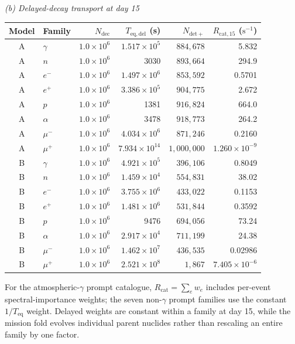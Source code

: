 \documentclass[11pt]{article}
\begin{document}
\begin{table}[!htbp]
\vspace{0.45em}
\noindent\textit{(b) Delayed-decay transport at day 15}\par\vspace{0.20em}
\begin{tabular}{clrrrr}
\toprule
Model & Family & $N_{\mathrm{dec}}$ & $T_{\mathrm{eq,del}}$ (s)
& $N_{\mathrm{det+}}$ & $R_{\mathrm{cat},15}$ ($\mathrm{s^{-1}}$) \\
\midrule
A & $\gamma$ & $1.0\times10^6$ & $1.517\times10^5$ & $884{,}678$ & 5.832 \\
A & $n$ & $1.0\times10^6$ & 3030 & $893{,}664$ & 294.9 \\
A & $e^-$ & $1.0\times10^6$ & $1.497\times10^6$ & $853{,}592$ & 0.5701 \\
A & $e^+$ & $1.0\times10^6$ & $3.386\times10^5$ & $904{,}775$ & 2.672 \\
A & $p$ & $1.0\times10^6$ & 1381 & $916{,}824$ & 664.0 \\
A & $\alpha$ & $1.0\times10^6$ & 3478 & $918{,}773$ & 264.2 \\
A & $\mu^-$ & $1.0\times10^6$ & $4.034\times10^6$ & $871{,}246$ & 0.2160 \\
A & $\mu^+$ & $1.0\times10^6$ & $7.934\times10^{14}$ & $1{,}000{,}000$ & $1.260\times10^{-9}$ \\
\addlinespace[0.25em]
B & $\gamma$ & $1.0\times10^6$ & $4.921\times10^5$ & $396{,}106$ & 0.8049 \\
B & $n$ & $1.0\times10^6$ & $1.459\times10^4$ & $554{,}831$ & 38.02 \\
B & $e^-$ & $1.0\times10^6$ & $3.755\times10^6$ & $433{,}022$ & 0.1153 \\
B & $e^+$ & $1.0\times10^6$ & $1.481\times10^6$ & $531{,}844$ & 0.3592 \\
B & $p$ & $1.0\times10^6$ & 9476 & $694{,}056$ & 73.24 \\
B & $\alpha$ & $1.0\times10^6$ & $2.917\times10^4$ & $711{,}199$ & 24.38 \\
B & $\mu^-$ & $1.0\times10^6$ & $1.462\times10^7$ & $436{,}535$ & 0.02986 \\
B & $\mu^+$ & $1.0\times10^6$ & $2.521\times10^8$ & $1{,}867$ & $7.405\times10^{-6}$ \\
\bottomrule
\end{tabular}

\vspace{0.35em}
\parbox{0.97\linewidth}{\raggedright For the atmospheric-$\gamma$ prompt
catalogue, $R_{\mathrm{cat}}=\sum_e w_e$ includes per-event spectral-importance
weights; the seven non-$\gamma$ prompt families use the constant
$1/T_{\mathrm{eq}}$ weight. Delayed weights are constant within a family at day
15, while the mission fold evolves individual parent nuclides rather than
rescaling an entire family by one factor.}
\end{table}
\endgroup
\end{document}
